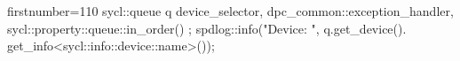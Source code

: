 \begin{cppcode*}{firstnumber=110}
        sycl::queue q{
          device_selector, 
          dpc_common::exception_handler, 
          sycl::property::queue::in_order()
        };
        spdlog::info("Device: {}", q.get_device().
          get_info<sycl::info::device::name>());
\end{cppcode*}
